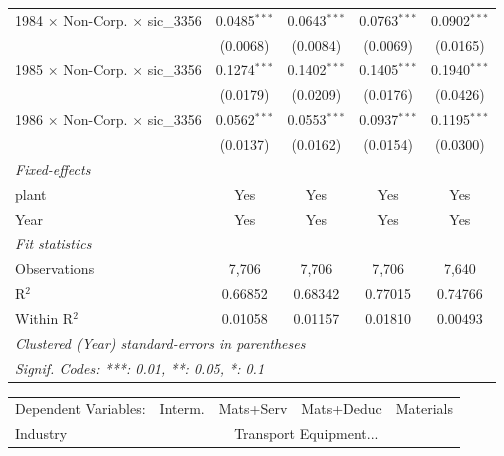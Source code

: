 \documentclass[
  12pt]{article}
\theoremstyle{definition}
\theoremstyle{remark}
\begin{document}
\begin{table}
\begin{minipage}{\linewidth}
\begin{tabular}{lcccc}
   1984 $\times$ Non-Corp. $\times$ sic\_3356    & 0.0485$^{***}$ & 0.0643$^{***}$ & 0.0763$^{***}$ & 0.0902$^{***}$\\   
                                                 & (0.0068)       & (0.0084)       & (0.0069)       & (0.0165)\\   
   1985 $\times$ Non-Corp. $\times$ sic\_3356    & 0.1274$^{***}$ & 0.1402$^{***}$ & 0.1405$^{***}$ & 0.1940$^{***}$\\   
                                                 & (0.0179)       & (0.0209)       & (0.0176)       & (0.0426)\\   
   1986 $\times$ Non-Corp. $\times$ sic\_3356    & 0.0562$^{***}$ & 0.0553$^{***}$ & 0.0937$^{***}$ & 0.1195$^{***}$\\   
                                                 & (0.0137)       & (0.0162)       & (0.0154)       & (0.0300)\\   
   \midrule
   \emph{Fixed-effects}\\
   plant                                         & Yes            & Yes            & Yes            & Yes\\  
   Year                                          & Yes            & Yes            & Yes            & Yes\\  
   \midrule
   \emph{Fit statistics}\\
   Observations                                  & 7,706          & 7,706          & 7,706          & 7,640\\  
   R$^2$                                         & 0.66852        & 0.68342        & 0.77015        & 0.74766\\  
   Within R$^2$                                  & 0.01058        & 0.01157        & 0.01810        & 0.00493\\  
   \midrule \midrule
   \multicolumn{5}{l}{\emph{Clustered (Year) standard-errors in parentheses}}\\
   \multicolumn{5}{l}{\emph{Signif. Codes: ***: 0.01, **: 0.05, *: 0.1}}\\
\end{tabular}
\par\endgroup
\begingroup
\centering
\begin{tabular}{lcccc}
   \tabularnewline \midrule \midrule
   Dependent Variables:                          & Interm.        & Mats+Serv      & Mats+Deduc     & Materials\\  
   Industry & \multicolumn{4}{c}{Transport Equipment...} \\ 

\end{tabular}
\end{minipage}
\end{table}
\end{document}
